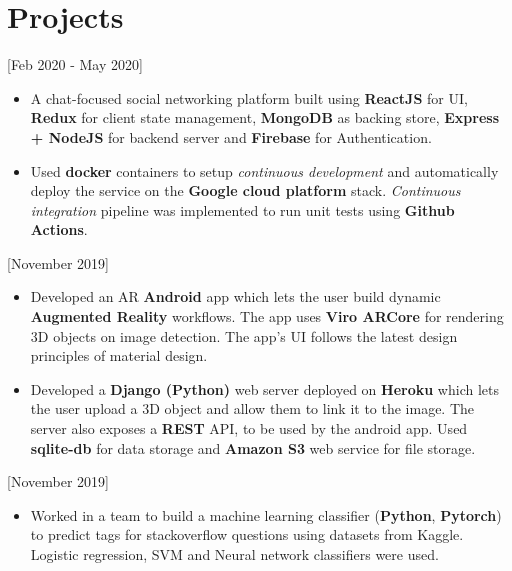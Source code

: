 \documentclass{article}
\begin{document}
\vspace{0.5cm}
\section{Projects}

 [\normalfont{}Feb 2020 - May 2020]
\begin{itemize}
    \item A chat-focused social networking platform built using \textbf{ReactJS} for UI, \textbf{Redux} for client state management, 
    \textbf{MongoDB} as backing store, \textbf{Express + NodeJS} for backend server and \textbf{Firebase} for Authentication. 
    
    \item  Used \textbf{docker} containers to setup \emph{continuous development} and automatically deploy the service on the \textbf{Google cloud platform} stack. 
    \emph{Continuous integration} pipeline was implemented to run unit tests using \textbf{Github Actions}. 
   
\end{itemize} 

 [\normalfont{}November 2019]
\begin{itemize}
    \item Developed an AR \textbf{Android} app which lets the user build dynamic \textbf{Augmented Reality} workflows. 
    The app uses \textbf{Viro ARCore} for rendering 3D objects on image detection. 
    The app's UI follows the latest design principles of material design.
    \item Developed a \textbf{Django (Python)} web server deployed on \textbf{Heroku} which lets the user upload a 3D object and allow them to link it to the image.
     The server also exposes a \textbf{REST} API, to be used by the android app. Used \textbf{sqlite-db} 
     for data storage and \textbf{Amazon S3} web service for file storage.
\end{itemize} 

 [\normalfont{}November 2019]
\begin{itemize}
    \item Worked in a team to build a machine learning classifier (\textbf{Python}, \textbf{Pytorch}) to predict tags for 
    stackoverflow questions using datasets from Kaggle. Logistic regression, SVM and Neural network classifiers were used.
\end{itemize} 
\end{document}
